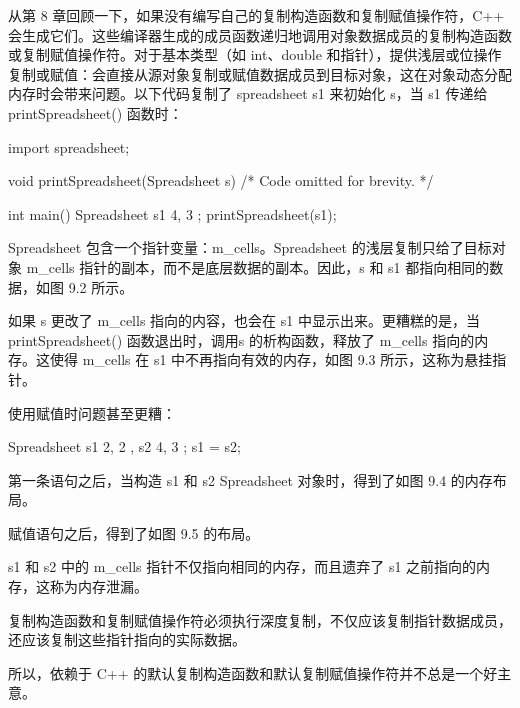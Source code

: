 
从第 8 章回顾一下，如果没有编写自己的复制构造函数和复制赋值操作符，C++ 会生成它们。这些编译器生成的成员函数递归地调用对象数据成员的复制构造函数或复制赋值操作符。对于基本类型（如 int、double 和指针），提供浅层或位操作复制或赋值：会直接从源对象复制或赋值数据成员到目标对象，这在对象动态分配内存时会带来问题。以下代码复制了 spreadsheet s1 来初始化 s，当 s1 传递给 printSpreadsheet() 函数时：

\begin{cpp}
import spreadsheet;

void printSpreadsheet(Spreadsheet s) { /* Code omitted for brevity. */ }

int main()
{
    Spreadsheet s1 { 4, 3 };
    printSpreadsheet(s1);
}
\end{cpp}

Spreadsheet 包含一个指针变量：m\_cells。Spreadsheet 的浅层复制只给了目标对象 m\_cells 指针的副本，而不是底层数据的副本。因此，s 和 s1 都指向相同的数据，如图 9.2 所示。


如果 s 更改了 m\_cells 指向的内容，也会在 s1 中显示出来。更糟糕的是，当 printSpreadsheet() 函数退出时，调用s 的析构函数，释放了 m\_cells 指向的内存。这使得 m\_cells 在 s1 中不再指向有效的内存，如图 9.3 所示，这称为悬挂指针。


使用赋值时问题甚至更糟：

\begin{cpp}
Spreadsheet s1 { 2, 2 }, s2 { 4, 3 };
s1 = s2;
\end{cpp}

第一条语句之后，当构造 s1 和 s2 Spreadsheet 对象时，得到了如图 9.4 的内存布局。


赋值语句之后，得到了如图 9.5 的布局。


s1 和 s2 中的 m\_cells 指针不仅指向相同的内存，而且遗弃了 s1 之前指向的内存，这称为内存泄漏。

复制构造函数和复制赋值操作符必须执行深度复制，不仅应该复制指针数据成员，还应该复制这些指针指向的实际数据。

所以，依赖于 C++ 的默认复制构造函数和默认复制赋值操作符并不总是一个好主意。

